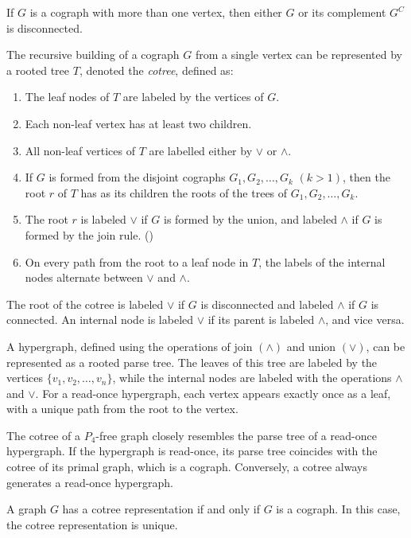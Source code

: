 \begin{lemma}
If $G$ is a cograph with more than one vertex, then either $G$ or its complement $G^C$ is disconnected. \cite{CLB81}
\end{lemma}

The recursive building of a cograph $G$ from a single vertex can be represented by a rooted tree $T$, denoted the \emph{cotree}, defined as:
\begin{enumerate}
\item The leaf nodes of $T$ are labeled by the vertices of $G$.
\item Each non-leaf vertex has at least two children.
\item All non-leaf vertices of $T$ are labelled either by $\vee$ or $\wedge$.
\item If $G$ is formed from the disjoint cographs $G_1,G_2,\dots,G_k$ $(k>1)$, then the root $r$ of $T$ has as its children the roots of the trees of $G_1,G_2,\dots,G_k$.
\item The root $r$ is labeled $\vee$ if $G$ is formed by the union, and labeled $\wedge$ if $G$ is formed by the join rule. (\theequation)
\item On every path from the root to a leaf node in $T$, the labels of the internal nodes alternate between $\vee$ and $\wedge$.
\end{enumerate}

The root of the cotree is labeled $\vee$ if $G$ is disconnected and labeled $\wedge$ if $G$ is connected. An internal node is labeled $\vee$ if its parent is labeled $\wedge$, and vice versa.

A hypergraph, defined using the operations of join $(\wedge)$ and union $(\vee)$, can be represented as a rooted parse tree. The leaves of this tree are labeled by the vertices $\{v_1,v_2,\dots,v_n\}$, while the internal nodes are labeled with the operations $\wedge$ and $\vee$. For a read-once hypergraph, each vertex appears exactly once as a leaf, with a unique path from the root to the vertex.

The cotree of a $P_4$-free graph closely resembles the parse tree of a read-once hypergraph. If the hypergraph is read-once, its parse tree coincides with the cotree of its primal graph, which is a cograph. Conversely, a cotree always generates a read-once hypergraph.

\begin{theorem}
A graph $G$ has a cotree representation if and only if $G$ is a cograph. In this case, the cotree representation is unique.
\end{theorem}

